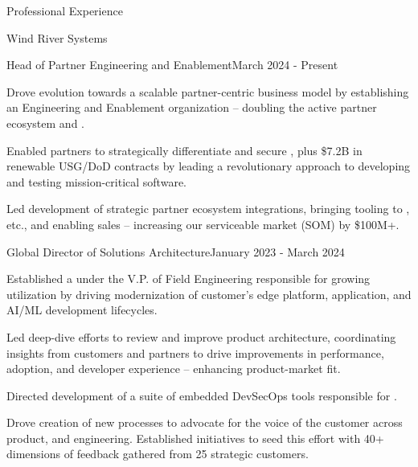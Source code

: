 \documentclass{resume} %
\begin{document}
\begin{rSection}{Professional Experience}

  \begin{rCompany}{Wind River Systems}{}{}
    \begin{rRole}{Head of Partner Engineering and Enablement}{}{March 2024 - Present}
      \item Drove evolution towards a scalable partner-centric business model by establishing an Engineering and Enablement organization -- doubling the active partner ecosystem and .
      \item Enabled partners to strategically differentiate and secure , plus \$7.2B in renewable USG/DoD contracts by leading a revolutionary approach to developing and testing mission-critical software.
      \item Led development of strategic partner ecosystem integrations, bringing tooling to , etc., and enabling  sales -- increasing our serviceable market (SOM) by \$100M+.
    \end{rRole}
    
    \begin{rRole}{Global Director of Solutions Architecture}{}{January 2023 - March 2024}
      \item Established a  under the V.P. of Field Engineering responsible for growing utilization by driving modernization of customer's edge platform, application, and AI/ML development lifecycles.
      \item Led deep-dive efforts to review and improve product architecture, coordinating insights from customers and partners to drive improvements in performance, adoption, and developer experience -- enhancing product-market fit.
      \item Directed development of a suite of embedded DevSecOps tools responsible for .
      \item Drove creation of new processes to advocate for the voice of the customer across product, and engineering. Established initiatives to seed this effort with 40+ dimensions of feedback gathered from 25 strategic customers.
    \end{rRole}
  \end{rCompany}


\end{rSection}
\end{document}
